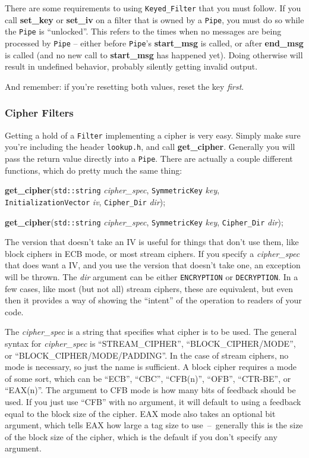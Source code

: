 \documentclass{article}
\newcommand{\filename}[1]{\texttt{#1}}
\newcommand{\function}[1]{\textbf{#1}}
\newcommand{\type}[1]{\texttt{#1}}
\renewcommand{\arg}[1]{\textsl{#1}}
\begin{document}
There are some requirements to using \type{Keyed\_Filter} that you must
follow. If you call \function{set\_key} or \function{set\_iv} on a filter that
is owned by a \type{Pipe}, you must do so while the \type{Pipe} is
``unlocked''. This refers to the times when no messages are being processed by
\type{Pipe} -- either before \type{Pipe}'s \function{start\_msg} is called, or
after \function{end\_msg} is called (and no new call to \function{start\_msg}
has happened yet). Doing otherwise will result in undefined behavior, probably
silently getting invalid output.

And remember: if you're resetting both values, reset the key \emph{first}.

\subsubsection{Cipher Filters}

Getting a hold of a \type{Filter} implementing a cipher is very easy. Simply
make sure you're including the header \filename{lookup.h}, and call
\function{get\_cipher}. Generally you will pass the return value directly into
a \type{Pipe}. There are actually a couple different functions, which do pretty
much the same thing:

\function{get\_cipher}(\type{std::string} \arg{cipher\_spec},
                       \type{SymmetricKey} \arg{key},
                       \type{InitializationVector} \arg{iv},
                       \type{Cipher\_Dir} \arg{dir});

\function{get\_cipher}(\type{std::string} \arg{cipher\_spec},
                       \type{SymmetricKey} \arg{key},
                       \type{Cipher\_Dir} \arg{dir});

The version that doesn't take an IV is useful for things that don't use them,
like block ciphers in ECB mode, or most stream ciphers. If you specify a
\arg{cipher\_spec} that does want a IV, and you use the version that doesn't
take one, an exception will be thrown. The \arg{dir} argument can be either
\type{ENCRYPTION} or \type{DECRYPTION}. In a few cases, like most (but not all)
stream ciphers, these are equivalent, but even then it provides a way of
showing the ``intent'' of the operation to readers of your code.

The \arg{cipher\_spec} is a string that specifies what cipher is to be
used. The general syntax for \arg{cipher\_spec} is ``STREAM\_CIPHER'',
``BLOCK\_CIPHER/MODE'', or ``BLOCK\_CIPHER/MODE/PADDING''. In the case of
stream ciphers, no mode is necessary, so just the name is sufficient. A block
cipher requires a mode of some sort, which can be ``ECB'', ``CBC'', ``CFB(n)'',
``OFB'', ``CTR-BE'', or ``EAX(n)''. The argument to CFB mode is how many bits
of feedback should be used. If you just use ``CFB'' with no argument, it will
default to using a feedback equal to the block size of the cipher. EAX mode
also takes an optional bit argument, which tells EAX how large a tag size to
use~--~generally this is the size of the block size of the cipher, which is the
default if you don't specify any argument.
\end{document}
